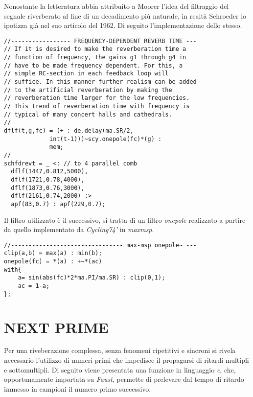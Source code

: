 Nonostante la letteratura abbia attribuito a Moorer l'idea del filtraggio
del segnale riverberato al fine di un decadimento più naturale, in realtà
Schroeder lo ipotizza già nel suo articolo del 1962. Di seguito
l'implementazione dello stesso.

\begin{lstlisting}
//----------------- FREQUENCY-DEPENDENT REVERB TIME ---
// If it is desired to make the reverberation time a
// function of frequency, the gains g1 through g4 in
// have to be made frequency dependent. For this, a
// simple RC-section in each feedback loop will
// suffice. In this manner further realism can be added
// to the artificial reverberation by making the
// reverberation time larger for the low frequencies.
// This trend of reverberation time with frequency is
// typical of many concert halls and cathedrals.
//
dflf(t,g,fc) = (+ : de.delay(ma.SR/2,
             int(t-1)))~scy.onepole(fc)*(g) :
             mem;
//
schfdrevt = _ <: // to 4 parallel comb
  dflf(1447,0.812,5000),
  dflf(1721,0.78,4000),
  dflf(1873,0.76,3000),
  dflf(2161,0.74,2000) :>
  apf(83,0.7) : apf(229,0.7);
\end{lstlisting}

Il filtro utilizzato è il successivo, si tratta di un filtro \textit{onepole}
realizzato a partire da quello implementato da \emph{Cycling74'} in \emph{maxmsp}.

\begin{lstlisting}
//-------------------------------- max-msp onepole~ ---
clip(a,b) = max(a) : min(b);
onepole(fc) = *(a) : +~*(ac)
with{
    a= sin(abs(fc)*2*ma.PI/ma.SR) : clip(0,1);
    ac = 1-a;
};
\end{lstlisting}

\section*{NEXT PRIME}

Per una riveberazione complessa, senza fenomeni ripetitivi e sincroni si rivela
necessario l'utilizzo di numeri primi che impedisce il propagarsi di ritardi
multipli e sottomultipli. Di seguito viene presentata una funzione in linguaggio
\emph{c}, che, opportunamente importata su \emph{Faust}, permette di prelevare
dal tempo di ritardo immesso in campioni il numero primo successivo.

